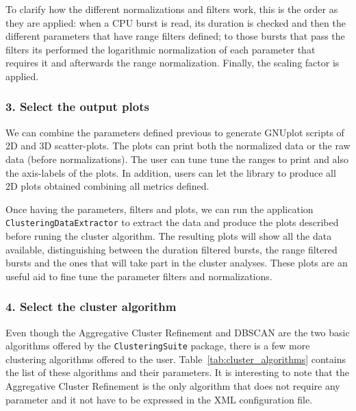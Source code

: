 \documentclass[twoside,a4,english,11pt]{book}
\begin{document}
To clarify how the different normalizations and filters work, this is the 
order as they are applied: when a CPU burst is read, its duration is checked
and then the different parameters that have range filters defined; to those
bursts that pass the filters its performed the logarithmic normalization of 
each parameter that requires it and afterwards the range normalization. 
Finally, the scaling factor is applied.

\subsubsection*{3. Select the output plots}

We can combine the parameters defined previous to generate GNUplot scripts
of 2D and 3D scatter-plots. The plots can print both the normalized data or
the raw data (before normalizations). The user can tune tune the ranges to 
print and also the axis-labels of the plots. In addition, users can let the
library to produce all 2D plots obtained combining all metrics defined.

Once having the parameters, filters and plots, we can run the application
\texttt{Clustering\-DataExtractor} to extract the data and produce the plots 
described before runing the cluster algorithm. The resulting plots will 
show all the data available, distinguishing between the duration filtered 
bursts, the range filtered bursts and the ones that will take part in the 
cluster analyses. These plots are an useful aid to fine tune the parameter 
filters and normalizations.

\subsubsection*{4. Select the cluster algorithm}

Even though the Aggregative Cluster Refinement and DBSCAN are the two basic
algorithms offered by the \texttt{ClusteringSuite} package, there is a few
more clustering algorithms offered to the user. Table~\ref{tab:cluster_algorithms}
contains the list of these algorithms and their parameters. It is interesting
to note that the Aggregative Cluster Refinement is the only algorithm that
does not require any parameter and it not have to be expressed in the
XML configuration file.
\end{document}
